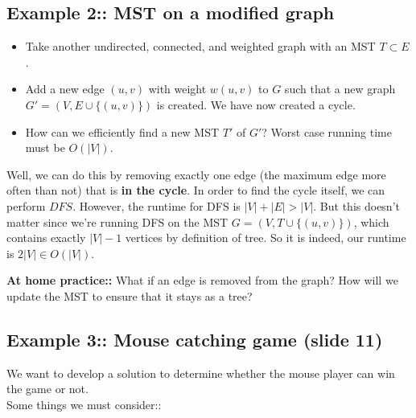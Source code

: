 \documentclass[12pt]{book}
\begin{document}
\subsection*{Example 2:: MST on a modified graph}

\begin{itemize}
    \item Take another undirected, connected, and weighted graph with an MST $T\subset E$.
    \item Add a new edge $(u,v)$ with weight $w(u,v)$ to $G$ such that a new graph $G'=(V,E\cup  \{(u,v)\})$ is created. We have now created a cycle.
    \item How can we efficiently find a new MST $T'$ of $G'$? Worst case running time must be $O(|V|)$.
\end{itemize}

Well, we can do this by removing exactly one edge (the maximum edge more often than not) that is \textbf{in the cycle}. In order to find the cycle itself, we can perform $DFS$. However, the runtime for DFS is $|V|+|E|>|V|$. But this doesn't matter since we're running DFS on the MST $G=(V,T\cup\{(u,v)\})$, which contains exactly $|V|-1$ vertices by definition of tree. So it is indeed, our runtime is $2|V|\in O(|V|)$.

\textbf{At home practice::} What if an edge is removed from the graph? How will we update the MST to ensure that it stays as a tree?


\subsection*{Example 3:: Mouse catching game (slide 11)}
We want to develop a solution to determine whether the mouse player can win the game or not.\\
Some things we must consider::
\end{document}

